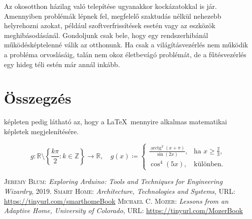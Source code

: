 \documentclass{thesis-ekf}
\theoremstyle{definition}
\DeclareMathOperator{\arctg}{arctg}
\begin{document}
Az okosotthon házilag való telepítése ugyanakkor kockázatokkal is jár. Amennyiben problémák lépnek fel, megfelelő szaktudás nélkül nehezebb helyrehozni azokat, például szoftverfrissítések esetén vagy az eszközök meghibásodásánál. Gondoljunk csak bele, hogy egy rendszerhibánál működésképtelenné válik az otthonunk. Ha csak a világításvezérlés nem működik a probléma orvoslásáig, talán nem okoz életbevágó problémát, de a fűtésvezérlés egy hideg téli estén már annál inkább.


\chapter*{Összegzés}
 \Az{\eqref{matKeplet}} képleten pedig látható az, hogy a \LaTeX~mennyire alkalmas matematikai  képletek megjelenítésére.
 
\begin{equation}\label{matKeplet}
	g\colon \mathbb{R} \setminus \left\{\frac{k\pi}{2}:k\in \mathbb{Z}\right\}\rightarrow \mathbb{R},\quad g(x)\coloneq
	\begin{cases}
		\frac{\arctg^2(x+\pi)}{\sin(2x)},&\text{ha }x\geq\frac{2}{3},\\
		\cos^4(5x), &\text{különben.}
	\end{cases}
\end{equation}



\begin{thebibliography}{2}
\textsc{Jeremy Blum}: \emph{Exploring Arduino: Tools and Techniques for Engineering Wizardry}, 2019.
\textsc{Smart Home:} \emph{Architecture, Technologies and Systems},
\textsc{URL:} \url{https://tinyurl.com/smarthomeBook}
\textsc{Michael C. Mozer:} \emph{Lessons from an Adaptive Home, University of Colorado},
\textsc{URL:} \url{ https://tinyurl.com/MozerBook}
\end{thebibliography}
\end{document}
